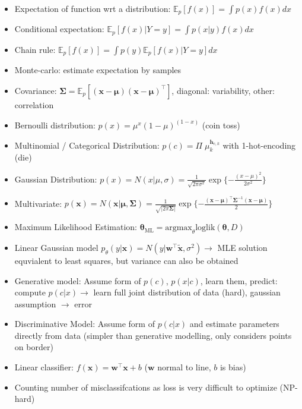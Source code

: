\documentclass[11pt]{scrartcl}
\begin{document}
\begin{itemize}
    \item Expectation of function wrt a distribution: \(\mathbb{E}_p [f(x)] = 
        \int p(x) f(x) dx\)
    \item Conditional expectation: \(\mathbb{E}_p [f(x) | Y = y] = \int p(x | y) f(x) dx\)
    \item Chain rule: \(\mathbb{E}_p [f(x)] = \int p(y) \mathbb{E}_p [f(x) | Y = y] dx\)
    \item Monte-carlo: estimate expectation by samples
    \item Covariance: \(\bm{\Sigma} = \mathbb{E}_p [(\bm{x - \mu})(\bm{x - \mu})^\top]\), 
        diagonal: variability, other: correlation
    \item Bernoulli distribution: \(p(x) = \mu^x (1 - \mu)^{(1 - x)}\) (coin toss)
    \item Multinomial / Categorical Distribution: \(p(c) = \Pi \; \mu_k^{\bm{h}_{c, k}}\) 
        with 1-hot-encoding (die)
    \item Gaussian Distribution: \(p(x) = N(x | \mu, \sigma) = \frac{1}{\sqrt{2 \pi \sigma^2}} 
        \exp \{- \frac{(x - \mu)^2}{2 \sigma^2} \} \)
    \item Multivariate: \(p(\bm{x}) = N(\bm{x} | \bm{\mu}, \bm{\Sigma}) = 
        \frac{1}{\sqrt{| 2 \pi \bm{\Sigma} |}} 
        \exp \{ - \frac{(\bm{x} - \bm{\mu})^\top \bm{\Sigma}^{-1} (\bm{x} - \bm{\mu})}{2} \} \)
    \item Maximum Likelihood Estimation: \(\bm{\theta}_{\mathrm{ML}} = 
        \mathrm{argmax}_\theta \mathrm{loglik} (\bm{\theta}, D)\)
    \item Linear Gaussian model \(p_\theta (y | \bm{x}) = 
        N(y | \bm{w}^\top \tilde{\bm{x}}, \sigma^2) \rightarrow \) MLE solution equvialent to 
        least squares, but variance can also be obtained
    \item Generative model: Assume form of \(p(c)\), \(p(x | c)\), learn them, 
        predict: compute \(p(c | x) \rightarrow\) learn full joint distribution of data (hard), 
        gaussian assumption \(\rightarrow\) error
    \item Discriminative Model: Assume form of \(p(c | x)\) and estimate parameters directly 
        from data (simpler than generative modelling, only considers points on border)
    \item Linear classifier: \(f(\bm{x}) = \bm{w}^\top \bm{x} + b\) 
        (\(\bm{w}\) normal to line, \(b\) is bias)
    \item Counting number of misclassifcations as loss is very difficult to optimize (NP-hard)

\end{itemize}
\end{document}
